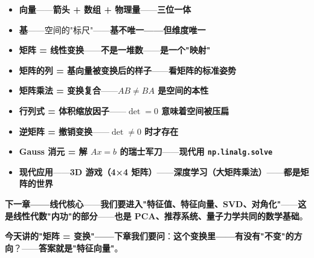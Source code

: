 \begin{tcolorbox}[essbox={本章核心}]
\begin{itemize}
\item \textbf{向量}——\textbf{箭头 + 数组 + 物理量}——\textbf{三位一体}
\item \textbf{基}——空间的"标尺"——\textbf{基不唯一——但维度唯一}
\item \textbf{矩阵 = 线性变换}——\textbf{不是一堆数}——\textbf{是一个"映射"}
\item \textbf{矩阵的列 = 基向量被变换后的样子}——\textbf{看矩阵的标准姿势}
\item \textbf{矩阵乘法 = 变换复合}——\textbf{$AB \ne BA$ 是空间的本性}
\item \textbf{行列式 = 体积缩放因子}——\textbf{$\det = 0$ 意味着空间被压扁}
\item \textbf{逆矩阵 = 撤销变换}——\textbf{$\det \ne 0$ 时才存在}
\item \textbf{Gauss 消元 = 解 $Ax = b$ 的瑞士军刀}——\textbf{现代用 \texttt{np.linalg.solve}}
\item \textbf{现代应用}——\textbf{3D 游戏（4×4 矩阵）}——\textbf{深度学习（大矩阵乘法）}——\textbf{都是矩阵的世界}
\end{itemize}
\end{tcolorbox}

\textbf{下一章——线代核心}——\textbf{我们要进入"特征值、特征向量、SVD、对角化"}——\textbf{这是线性代数"内功"的部分}——\textbf{也是 PCA、推荐系统、量子力学共同的数学基础}。

\textbf{今天讲的"矩阵 = 变换"——下章我们要问}：\textbf{这个变换里——有没有"不变"的方向}？——\textbf{答案就是"特征向量"}。

\clearpage
